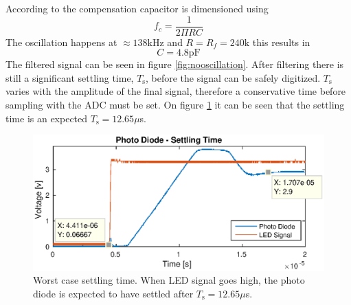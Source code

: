  According to \cite{mec} the compensation capacitor is dimensioned using
$$f_c=\frac{1}{2\Pi R C}$$
The oscillation happens at $\approx 138\text{kHz}$ and $R = R_f = 240\text{k}$ this results in 
$$C = 4.8\text{pF}$$
The filtered signal can be seen in figure \ref{fig:nooscillation}. After filtering there is still a significant settling time, $T_{\text{s}}$, before the signal can be safely digitized. $T_{\text{s}}$ varies with the amplitude of the final signal, therefore a conservative time before sampling with the ADC must be set. 
On figure \ref{fig:settletime} it can be seen that the settling time is an expected $T_{\text{s}}=12.65\mu$s.
\begin{figure}[h!]
	\includegraphics[width=\linewidth]{images/settle}
	\caption{Worst case settling time. When LED signal goes high, the photo diode is expected to have settled after $T_{\text{s}}=12.65\mu$s.}
	\label{fig:settletime}
\end{figure}